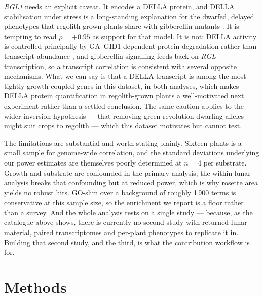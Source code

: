 \documentclass[11pt,a4paper]{article}
\begin{document}
\textit{RGL1} needs an explicit caveat. It encodes a DELLA protein, and DELLA
stabilisation under stress is a long-standing explanation for the dwarfed, delayed
phenotypes that regolith-grown plants share with gibberellin mutants
\citep{achard2006della,sananmishra2016della,colebrook2014ga}. It is tempting to read
$\rho = +0.95$ as support for that model. It is not: DELLA activity is controlled
principally by GA--GID1-dependent protein degradation rather than transcript abundance
\citep{sun2011della}, and gibberellin signalling feeds back on \textit{RGL}
transcription, so a transcript correlation is consistent with several opposite
mechanisms. What we can say is that a DELLA transcript is among the
most tightly growth-coupled genes in this dataset, in both analyses, which makes DELLA
protein quantification in regolith-grown plants a well-motivated next experiment rather
than a settled conclusion. The same caution applies to the wider inversion hypothesis
--- that removing green-revolution dwarfing alleles might suit crops to regolith
\citep{wu2020grf4della,hedden2020ga} --- which this dataset motivates but cannot test.

The limitations are substantial and worth stating plainly. Sixteen plants is a small
sample for genome-wide correlation, and the standard deviations underlying our power
estimates are themselves poorly determined at $n=4$ per substrate. Growth and substrate
are confounded in the primary analysis; the within-lunar analysis breaks that
confounding but at reduced power, which is why rosette area yields no robust hits.
GO-slim over a background of roughly 1\,900 terms is conservative at this sample size,
so the enrichment we report is a floor rather than a survey. And the whole analysis
rests on a single study --- because, as the catalogue above shows, there is currently no
second study with returned lunar material, paired transcriptomes and per-plant
phenotypes to replicate it in. Building that second study, and the third, is what the
contribution workflow is for.

\section{Methods}
\end{document}
